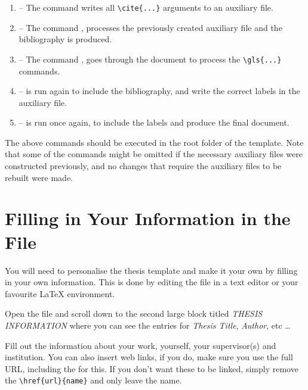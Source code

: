 \begin{enumerate}
  \item {} -- The command  writes all \verb|\cite{...}| arguments to an auxiliary file.

  \item {} -- The command , processes the previously created auxiliary file and the bibliography is produced.

  \item {} -- The command , goes through the document to process the \verb|\gls{...}| commands.

  \item {} --  is run again to include the bibliography, and write the correct labels in the auxiliary file.

  \item {} --  is run once again, to include the labels and produce the final document.
\end{enumerate}

The above commands should be executed in the root folder of the template. Note that some of the commands might be omitted if the necessary auxiliary files were constructed previously, and no changes that require the auxiliary files to be rebuilt were made.


\section{Filling in Your Information in the  File}\label{FillingFile}

You will need to personalise the thesis template and make it your own by filling in your own information. This is done by editing the  file in a text editor or your favourite LaTeX environment.

Open the file and scroll down to the second large block titled \emph{THESIS INFORMATION} where you can see the entries for \emph{Thesis Title}, \emph{Author}, etc \ldots

Fill out the information about your work, yourself, your supervisor(s) and institution. You can also insert web links, if you do, make sure you use the full URL, including the  for this. If you don't want these to be linked, simply remove the \verb|\href{url}{name}| and only leave the name.

